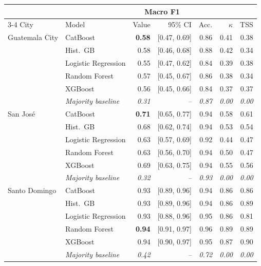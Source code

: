 \begin{tabular}{llrrrrr}
\toprule
 & & \multicolumn{2}{c}{Macro F1} & & & \\
\cmidrule(lr){3-4}
City & Model & Value & 95\% CI & Acc. & $\kappa$ & TSS \\
\midrule
Guatemala City & CatBoost & \textbf{0.58} & [0.47, 0.69] & 0.86 & 0.41 & 0.38 \\
 & Hist.\ GB & 0.58 & [0.46, 0.68] & 0.88 & 0.42 & 0.34 \\
 & Logistic Regression & 0.55 & [0.47, 0.62] & 0.84 & 0.39 & 0.38 \\
 & Random Forest & 0.57 & [0.45, 0.67] & 0.86 & 0.38 & 0.34 \\
 & XGBoost & 0.56 & [0.45, 0.66] & 0.84 & 0.37 & 0.37 \\
 & \emph{Majority baseline} & \emph{0.31} & \emph{--} & \emph{0.87} & \emph{0.00} & \emph{0.00} \\
\midrule
San Jos\'e & CatBoost & \textbf{0.71} & [0.65, 0.77] & 0.94 & 0.58 & 0.61 \\
 & Hist.\ GB & 0.68 & [0.62, 0.74] & 0.94 & 0.53 & 0.54 \\
 & Logistic Regression & 0.63 & [0.57, 0.69] & 0.92 & 0.44 & 0.47 \\
 & Random Forest & 0.63 & [0.56, 0.70] & 0.94 & 0.50 & 0.47 \\
 & XGBoost & 0.69 & [0.63, 0.75] & 0.94 & 0.55 & 0.56 \\
 & \emph{Majority baseline} & \emph{0.32} & \emph{--} & \emph{0.93} & \emph{0.00} & \emph{0.00} \\
\midrule
Santo Domingo & CatBoost & 0.93 & [0.89, 0.96] & 0.94 & 0.86 & 0.86 \\
 & Hist.\ GB & 0.93 & [0.89, 0.96] & 0.94 & 0.86 & 0.89 \\
 & Logistic Regression & 0.93 & [0.88, 0.96] & 0.95 & 0.86 & 0.81 \\
 & Random Forest & \textbf{0.94} & [0.91, 0.97] & 0.96 & 0.89 & 0.89 \\
 & XGBoost & 0.94 & [0.90, 0.97] & 0.95 & 0.87 & 0.90 \\
 & \emph{Majority baseline} & \emph{0.42} & \emph{--} & \emph{0.72} & \emph{0.00} & \emph{0.00} \\
\bottomrule
\end{tabular}
